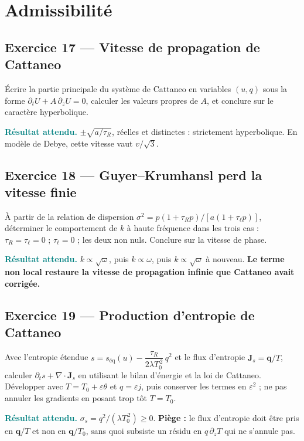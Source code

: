 \documentclass[11pt,a4paper]{article}
\newcommand{\rep}[1]{\par\smallskip\noindent\textcolor{teal}{\textbf{Résultat attendu.}}\; #1\par\smallskip}
\begin{document}
\section{Admissibilité}

\subsection*{Exercice 17 --- Vitesse de propagation de Cattaneo}

Écrire la partie principale du système de Cattaneo en variables $(u, q)$ sous la forme
$\partial_t U + A\,\partial_z U = 0$, calculer les valeurs propres de $A$, et conclure sur le
caractère hyperbolique.

\rep{$\pm\sqrt{a/\tau_R}$, réelles et distinctes : strictement hyperbolique. En modèle de Debye,
cette vitesse vaut $v/\sqrt{3}$.}

\subsection*{Exercice 18 --- Guyer--Krumhansl perd la vitesse finie}

À partir de la relation de dispersion $\sigma^2 = p(1+\tau_R p)/[a(1+\tau_\ell p)]$, déterminer le
comportement de $k$ à haute fréquence dans les trois cas : $\tau_R = \tau_\ell = 0$ ;
$\tau_\ell = 0$ ; les deux non nuls. Conclure sur la vitesse de phase.

\rep{$k \propto \sqrt{\omega}$, puis $k \propto \omega$, puis $k \propto \sqrt{\omega}$ à nouveau.
\textbf{Le terme non local restaure la vitesse de propagation infinie que Cattaneo avait corrigée.}}

\subsection*{Exercice 19 --- Production d'entropie de Cattaneo}

Avec l'entropie étendue $s = s_{\mathrm{éq}}(u) - \dfrac{\tau_R}{2\lambda T_0^{\,2}}\,q^2$ et le flux
d'entropie $\mathbf{J}_s = \mathbf{q}/T$, calculer $\partial_t s + \nabla\cdot\mathbf{J}_s$ en
utilisant le bilan d'énergie et la loi de Cattaneo. Développer avec $T=T_0+\varepsilon\theta$ et $q=\varepsilon j$, puis conserver les termes en $\varepsilon^2$ ; ne pas annuler les gradients en posant trop tôt $T=T_0$.

\rep{$\sigma_s = q^2/(\lambda T_0^{\,2}) \ge 0$. \textbf{Piège :} le flux d'entropie doit être pris
en $\mathbf{q}/T$ et non en $\mathbf{q}/T_0$, sans quoi subsiste un résidu en $q\,\partial_z T$ qui
ne s'annule pas.}
\end{document}
